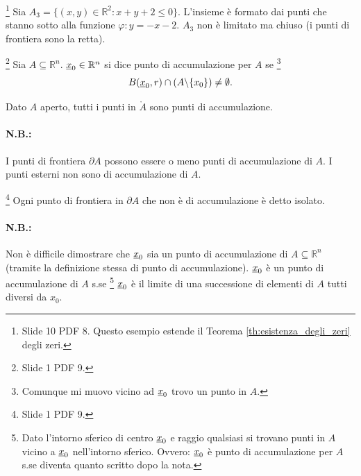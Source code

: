 \begin{example}\footnote{Slide 10 PDF 8. Questo esempio estende il Teorema \ref{th:esistenza_degli_zeri} degli zeri.}
    Sia $A_3=\{(x,y)\in\mathbb R^2\colon x+y+2\leq 0\}$. L'insieme è formato dai punti che stanno sotto alla funzione $\varphi:y=-x-2$. $A_3$ non è limitato ma chiuso (i punti di frontiera sono la retta). \footnotemark
\end{example}


\begin{definition}\footnote{Slide 1 PDF 9.}
    Sia $A\subseteq\mathbb R^n$. $\uline x_0\in\mathbb R^n$ si dice punto di accumulazione per $A$ se \footnote{Comunque mi muovo vicino ad $\uline x_0$ trovo un punto in $A$.}
    \begin{equation*}
        B(\uline x_0, r)\cap (A\backslash\{x_0\})\neq\emptyset.
    \end{equation*}
\end{definition}

\begin{remark}
    Dato $A$ aperto, tutti i punti in $\mathring A$ sono punti di accumulazione.
\end{remark}

\paragraph{N.B.:} I punti di frontiera $\partial A$ possono essere o meno punti di accumulazione di $A$. I punti esterni non sono di accumulazione di $A$.

\begin{definition}\footnote{Slide 1 PDF 9.}
    Ogni punto di frontiera in $\partial A$ che non è di accumulazione è detto isolato.
\end{definition}

\paragraph{N.B.:} Non è difficile dimostrare che $\uline x_0$ sia un punto di accumulazione di $A\subseteq\mathbb R^n$ (tramite la definizione stessa di punto di accumulazione). $\uline x_0$ è un punto di accumulazione di $A$ s.se \footnote{Dato l'intorno sferico di centro $\uline x_0$ e raggio qualsiasi si trovano punti in $A$ vicino a $\uline x_0$ nell'intorno sferico. Ovvero: $\uline x_0$ è punto di accumulazione per $A$ s.se diventa quanto scritto dopo la nota.} $\uline x_0$ è il limite di una successione di elementi di $A$ tutti diversi da $x_0$.

